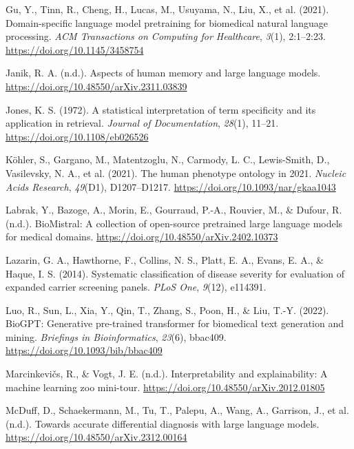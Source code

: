 \documentclass[
]{agujournal2019}
\newlength{\cslhangindent}
\newenvironment{CSLReferences}[2] %
 {\begin{list}{}{%
  \setlength{\itemindent}{0pt}
  \setlength{\leftmargin}{0pt}
  \setlength{\parsep}{0pt}
  \ifodd #1
   \setlength{\leftmargin}{\cslhangindent}
   \setlength{\itemindent}{-1\cslhangindent}
  \fi
  \setlength{\itemsep}{#2\baselineskip}}}
 {\end{list}}
\begin{document}
\begin{CSLReferences}{1}{0}
Gu, Y., Tinn, R., Cheng, H., Lucas, M., Usuyama, N., Liu, X., et al.
(2021). Domain-specific language model pretraining for biomedical
natural language processing. \emph{ACM Transactions on Computing for
Healthcare}, \emph{3}(1), 2:1--2:23.
\url{https://doi.org/10.1145/3458754}

Janik, R. A. (n.d.). Aspects of human memory and large language models.
\url{https://doi.org/10.48550/arXiv.2311.03839}

Jones, K. S. (1972). A statistical interpretation of term specificity
and its application in retrieval. \emph{Journal of Documentation},
\emph{28}(1), 11--21. \url{https://doi.org/10.1108/eb026526}

Köhler, S., Gargano, M., Matentzoglu, N., Carmody, L. C., Lewis-Smith,
D., Vasilevsky, N. A., et al. (2021). The human phenotype ontology in
2021. \emph{Nucleic Acids Research}, \emph{49}(D1), D1207--D1217.
\url{https://doi.org/10.1093/nar/gkaa1043}

Labrak, Y., Bazoge, A., Morin, E., Gourraud, P.-A., Rouvier, M., \&
Dufour, R. (n.d.). BioMistral: A collection of open-source pretrained
large language models for medical domains.
\url{https://doi.org/10.48550/arXiv.2402.10373}

Lazarin, G. A., Hawthorne, F., Collins, N. S., Platt, E. A., Evans, E.
A., \& Haque, I. S. (2014). Systematic classification of disease
severity for evaluation of expanded carrier screening panels. \emph{PLoS
One}, \emph{9}(12), e114391.

Luo, R., Sun, L., Xia, Y., Qin, T., Zhang, S., Poon, H., \& Liu, T.-Y.
(2022). BioGPT: Generative pre-trained transformer for biomedical text
generation and mining. \emph{Briefings in Bioinformatics}, \emph{23}(6),
bbac409. \url{https://doi.org/10.1093/bib/bbac409}

Marcinkevičs, R., \& Vogt, J. E. (n.d.). Interpretability and
explainability: A machine learning zoo mini-tour.
\url{https://doi.org/10.48550/arXiv.2012.01805}

McDuff, D., Schaekermann, M., Tu, T., Palepu, A., Wang, A., Garrison,
J., et al. (n.d.). Towards accurate differential diagnosis with large
language models. \url{https://doi.org/10.48550/arXiv.2312.00164}


\end{CSLReferences}
\end{document}
